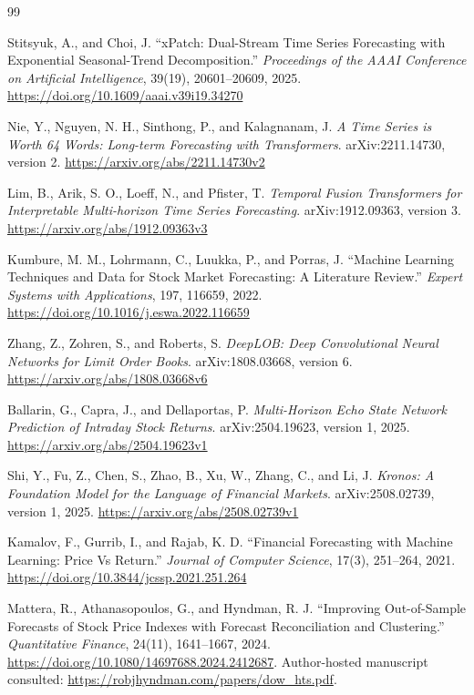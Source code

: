 \begin{thebibliography}{99}

\small\setlength{\itemsep}{0pt}\setlength{\parskip}{0pt}

 Stitsyuk, A., and Choi, J. ``xPatch: Dual-Stream Time Series Forecasting with Exponential Seasonal-Trend Decomposition.'' \emph{Proceedings of the AAAI Conference on Artificial Intelligence}, 39(19), 20601--20609, 2025. \url{https://doi.org/10.1609/aaai.v39i19.34270}

 Nie, Y., Nguyen, N. H., Sinthong, P., and Kalagnanam, J. \emph{A Time Series is Worth 64 Words: Long-term Forecasting with Transformers}. arXiv:2211.14730, version 2. \url{https://arxiv.org/abs/2211.14730v2}

 Lim, B., Arik, S. O., Loeff, N., and Pfister, T. \emph{Temporal Fusion Transformers for Interpretable Multi-horizon Time Series Forecasting}. arXiv:1912.09363, version 3. \url{https://arxiv.org/abs/1912.09363v3}

 Kumbure, M. M., Lohrmann, C., Luukka, P., and Porras, J. ``Machine Learning Techniques and Data for Stock Market Forecasting: A Literature Review.'' \emph{Expert Systems with Applications}, 197, 116659, 2022. \url{https://doi.org/10.1016/j.eswa.2022.116659}

 Zhang, Z., Zohren, S., and Roberts, S. \emph{DeepLOB: Deep Convolutional Neural Networks for Limit Order Books}. arXiv:1808.03668, version 6. \url{https://arxiv.org/abs/1808.03668v6}

 Ballarin, G., Capra, J., and Dellaportas, P. \emph{Multi-Horizon Echo State Network Prediction of Intraday Stock Returns}. arXiv:2504.19623, version 1, 2025. \url{https://arxiv.org/abs/2504.19623v1}

 Shi, Y., Fu, Z., Chen, S., Zhao, B., Xu, W., Zhang, C., and Li, J. \emph{Kronos: A Foundation Model for the Language of Financial Markets}. arXiv:2508.02739, version 1, 2025. \url{https://arxiv.org/abs/2508.02739v1}

 Kamalov, F., Gurrib, I., and Rajab, K. D. ``Financial Forecasting with Machine Learning: Price Vs Return.'' \emph{Journal of Computer Science}, 17(3), 251--264, 2021. \url{https://doi.org/10.3844/jcssp.2021.251.264}

 Mattera, R., Athanasopoulos, G., and Hyndman, R. J. ``Improving Out-of-Sample Forecasts of Stock Price Indexes with Forecast Reconciliation and Clustering.'' \emph{Quantitative Finance}, 24(11), 1641--1667, 2024. \url{https://doi.org/10.1080/14697688.2024.2412687}. Author-hosted manuscript consulted: \url{https://robjhyndman.com/papers/dow_hts.pdf}.


\end{thebibliography}
